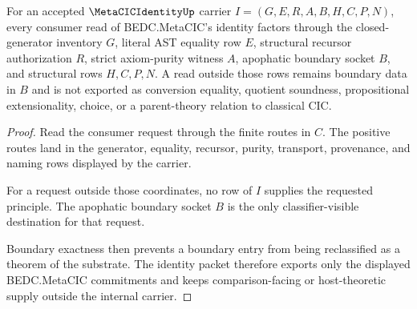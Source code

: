 \begin{theorem}
\label{thm:metacic-identity-boundary-nonescape}
For an accepted $\MetaCICIdentityUp$ carrier $I=(G,E,R,A,B,H,C,P,N)$, every consumer read of BEDC.MetaCIC's identity factors through the closed-generator inventory $G$, literal AST equality row $E$, structural recursor authorization $R$, strict axiom-purity witness $A$, apophatic boundary socket $B$, and structural rows $H,C,P,N$. A read outside those rows remains boundary data in $B$ and is not exported as conversion equality, quotient soundness, propositional extensionality, choice, or a parent-theory relation to classical CIC.
\end{theorem}
\begin{proof}
Read the consumer request through the finite routes in $C$. The positive routes land in the generator, equality, recursor, purity, transport, provenance, and naming rows displayed by the carrier.

For a request outside those coordinates, no row of $I$ supplies the requested principle. The apophatic boundary socket $B$ is the only classifier-visible destination for that request.

Boundary exactness then prevents a boundary entry from being reclassified as a theorem of the substrate. The identity packet therefore exports only the displayed BEDC.MetaCIC commitments and keeps comparison-facing or host-theoretic supply outside the internal carrier.
\end{proof}

